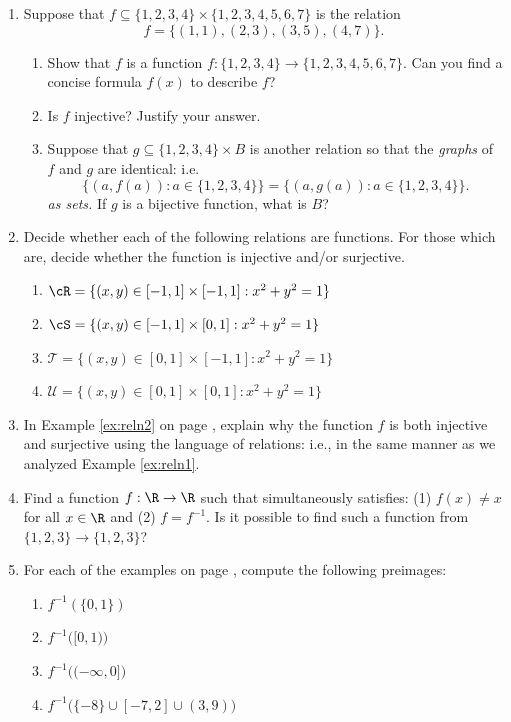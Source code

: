 \begin{enumerate}\renewcommand{\labelenumi}{\thesubsection.\theenumi}
  \item Suppose that $f\subseteq\{1,2,3,4\}\times\{1,2,3,4,5,6,7\}$ is the relation
  \[f=\{(1,1),(2,3),(3,5),(4,7)\}.\]
  \begin{enumerate}
    \item Show that $f$ is a function $f:\{1,2,3,4\}\to\{1,2,3,4,5,6,7\}$. Can you find a concise formula $f(x)$ to describe $f$?
    \item Is $f$ injective? Justify your answer.
    \item Suppose that $g\subseteq\{1,2,3,4\}\times B$ is another relation so that the \emph{graphs} of $f$ and $g$ are identical: i.e.
    \[\bigl\{(a,f(a)):a\in\{1,2,3,4\}\bigr\}=\bigl\{(a,g(a)):a\in\{1,2,3,4\}\bigr\}.\] \emph{as sets.} If $g$ is a bijective function, what is $B$?
  \end{enumerate}
  
  \item Decide whether each of the following relations are functions. For those which are, decide whether the function is injective and/or surjective.
  \begin{enumerate}
    \item $\cR=\{(x,y)\in[-1,1]\times[-1,1]:x^2+y^2=1\}$
    \item $\cS=\{(x,y)\in[-1,1]\times[0,1]:x^2+y^2=1\}$
    \item $\mathcal T=\{(x,y)\in[0,1]\times[-1,1]:x^2+y^2=1\}$
    \item $\mathcal U=\{(x,y)\in[0,1]\times[0,1]:x^2+y^2=1\}$
  \end{enumerate}
  
  \item In Example \ref{ex:reln2} on page \pageref{ex:reln2}, explain why the function $f$ is both injective and surjective using the language of relations: i.e., in the same manner as we analyzed Example \ref{ex:reln1}.
  
  \item Find a function $f : \R \to \R$ such that simultaneously satisfies: (1) $f(x) \neq x$ for all $x \in \R$ and (2) $f = f^{-1}$. Is it possible to find such a function from $\{1,2,3\} \to \{1,2,3\}$? 
  
  \item For each of the examples on page \pageref{ex:reln2}, compute the following preimages:
  \begin{enumerate}
    \item $f^{-1}(\{0,1\})$
    \item $f^{-1}\Big([0,1)\Big)$
    \item $f^{-1}\Big((-\infty,0]\Big)$
    \item $f^{-1}\Big(\{-8\}\cup[-7,2]\cup (3,9)\Big)$
  \end{enumerate}
  

\end{enumerate}
